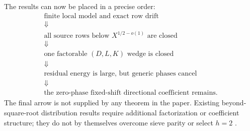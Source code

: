 The results can now be placed in a precise order:
\begin{equation}
 \begin{array}{c}
 \text{finite local model and exact row drift}\\
 \Downarrow\\
 \text{all source rows below }X^{1/2-o(1)}\text{ are closed}\\
 \Downarrow\\
 \text{one factorable }(D,L,K)\text{ wedge is closed}\\
 \Downarrow\\
 \text{residual energy is large, but generic phases cancel}\\
 \Downarrow\\
 \text{the zero-phase fixed-shift directional coefficient remains.}
 \end{array}
 \label{eq:boundary-flow}
\end{equation}
The final arrow is not supplied by any theorem in the paper.  Existing
beyond-square-root distribution results require additional factorization
or coefficient structure; they do not by themselves overcome sieve
parity or select $h=2$ \citep{Maynard2025I,Polymath2014,FordMaynard2024}.
